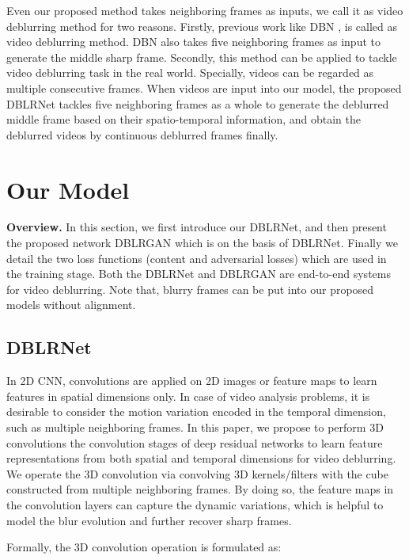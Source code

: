 \documentclass[journal]{IEEEtran}
\begin{document}
Even our proposed method takes neighboring frames as inputs, we call it as video deblurring method for two reasons. Firstly, previous work like DBN \cite{su2016deep}, is called as video deblurring method. DBN also takes five neighboring frames as input to generate the middle sharp frame. Secondly, this method can be applied to tackle video deblurring task in the real world. Specially, videos can be regarded as multiple consecutive frames. When videos are input into our model, the proposed DBLRNet tackles five neighboring frames as a whole to generate the deblurred middle frame based on their spatio-temporal information, and obtain the deblurred videos by continuous deblurred frames finally.

\section{Our Model}

\textbf{Overview.} In this section, we first introduce our DBLRNet, and then present the proposed network DBLRGAN which is on the basis of DBLRNet. Finally we detail the two loss functions (content and adversarial losses) which are used in the training stage. Both the DBLRNet and DBLRGAN are end-to-end systems for video deblurring. Note that, blurry frames can be put into our proposed models without alignment. 

\subsection{DBLRNet}

\noindent In 2D CNN, convolutions are applied on 2D images or feature maps to learn features in spatial dimensions only. In case of video analysis problems, it is desirable to consider the motion variation encoded in the temporal dimension, such as multiple neighboring frames. In this paper, we propose to perform 3D convolutions \cite{ji20133d} the convolution stages of deep residual networks to learn feature representations from both spatial and temporal dimensions for video deblurring. We operate the 3D convolution via convolving 3D kernels/filters with the cube constructed from multiple neighboring frames. By doing so, the feature maps in the convolution layers can capture the dynamic variations, which is helpful to model the blur evolution and further recover sharp frames.

Formally, the 3D convolution operation is formulated as:
\end{document}
